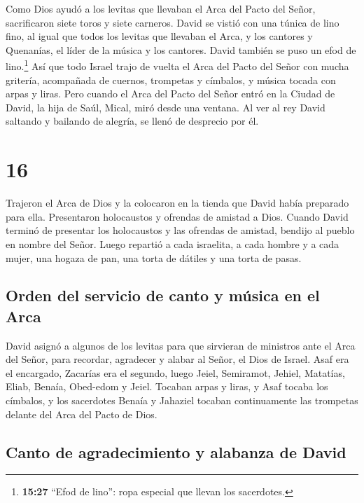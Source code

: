  Como Dios ayudó a los levitas que llevaban el Arca del
Pacto del Señor, sacrificaron siete toros y siete carneros.
 David se vistió con una túnica de lino fino, al igual
que todos los levitas que llevaban el Arca, y los cantores y Quenanías,
el líder de la música y los cantores. David también se puso un efod de
lino.\footnote{\textbf{15:27} ``Efod de lino'': ropa especial que llevan
  los sacerdotes.}  Así que todo Israel trajo de vuelta
el Arca del Pacto del Señor con mucha gritería, acompañada de cuernos,
trompetas y címbalos, y música tocada con arpas y liras. 
Pero cuando el Arca del Pacto del Señor entró en la Ciudad de David, la
hija de Saúl, Mical, miró desde una ventana. Al ver al rey David
saltando y bailando de alegría, se llenó de desprecio por él.

\hypertarget{section-15}{%
\section{16}\label{section-15}}

 Trajeron el Arca de Dios y la colocaron en la tienda que
David había preparado para ella. Presentaron holocaustos y ofrendas de
amistad a Dios.  Cuando David terminó de presentar los
holocaustos y las ofrendas de amistad, bendijo al pueblo en nombre del
Señor.  Luego repartió a cada israelita, a cada hombre y a
cada mujer, una hogaza de pan, una torta de dátiles y una torta de
pasas.

\hypertarget{orden-del-servicio-de-canto-y-muxfasica-en-el-arca}{%
\subsection{Orden del servicio de canto y música en el
Arca}\label{orden-del-servicio-de-canto-y-muxfasica-en-el-arca}}

 David asignó a algunos de los levitas para que sirvieran
de ministros ante el Arca del Señor, para recordar, agradecer y alabar
al Señor, el Dios de Israel.  Asaf era el encargado,
Zacarías era el segundo, luego Jeiel, Semiramot, Jehiel, Matatías,
Eliab, Benaía, Obed-edom y Jeiel. Tocaban arpas y liras, y Asaf tocaba
los címbalos,  y los sacerdotes Benaía y Jahaziel tocaban
continuamente las trompetas delante del Arca del Pacto de Dios.

\hypertarget{canto-de-agradecimiento-y-alabanza-de-david}{%
\subsection{Canto de agradecimiento y alabanza de
David}\label{canto-de-agradecimiento-y-alabanza-de-david}}

